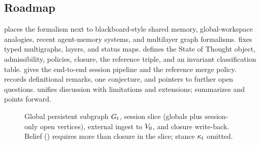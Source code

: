 \subsection{Roadmap}
\label{subsec:intro-roadmap}

 places the formalism next to blackboard-style shared memory, global-workspace analogies, recent agent-memory systems, and multilayer graph formalisms.
 fixes typed multigraphs, layers, and status maps.
 defines the State of Thought object, admissibility, policies, closure, the reference triple, and an invariant classification table.
 gives the end-to-end session pipeline and the reference merge policy.
 records definitional remarks, one conjecture, and pointers to further open questions.
 unifies discussion with limitations and extensions;  summarizes and points forward.

\begin{figure}[t]
  \centering
  
  \caption{Global persistent subgraph $G_t$, session slice (globals plus session-only open vertices), external ingest to $V_{0}$, and closure write-back.
  Belief () requires more than closure in the slice; stance $\kappa_t$ omitted.}
  \label{fig:overview}
\end{figure}
